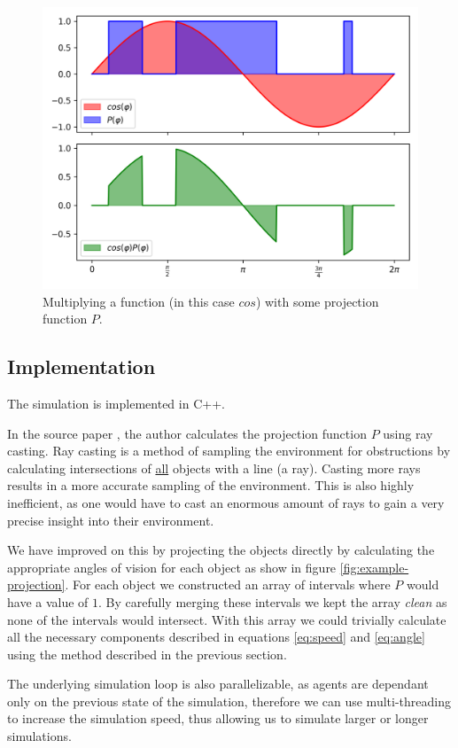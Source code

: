\documentclass[9pt]{pnas-new}
\begin{document}
\begin{figure}[h]
    \centering
    \includegraphics[width=0.6\linewidth]{integral.png}
    \caption{
      Multiplying a function (in this case $cos$) with some projection function $P$.
    }
    \label{fig:integral}
\end{figure}




\subsection{Implementation}

The simulation is implemented in C++.

In the source paper \cite{main-paper}, the author calculates the projection function $P$ using ray casting.
Ray casting is a method of sampling the environment for obstructions by calculating intersections of \underline{all} objects with a line (a ray).
Casting more rays results in a more accurate sampling of the environment.
This is also highly inefficient, as one would have to cast an enormous amount of rays to gain a very precise insight into their environment.

We have improved on this by projecting the objects directly by calculating the appropriate angles of vision for each object as show in figure \ref{fig:example-projection}.
For each object we constructed an array of intervals where $P$ would have a value of $1$.
By carefully merging these intervals we kept the array \textit{clean} as none of the intervals would intersect.
With this array we could trivially calculate all the necessary components described in equations \ref{eq:speed} and \ref{eq:angle} using the method described in the previous section.


The underlying simulation loop is also parallelizable, as agents are dependant only on the previous state of the simulation, therefore we can use multi-threading to increase the simulation speed, thus allowing us to simulate larger or longer simulations.
\end{document}
